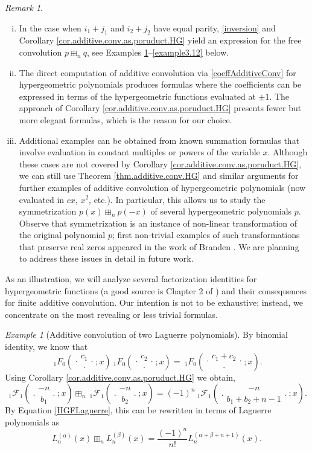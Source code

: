 \documentclass[reqno,11pt]{amsart}
\theoremstyle{remark}
\newtheorem{remark}[theorem]{Remark}
\newtheorem{example}[theorem]{Example}
\newcommand*\pFq[5]{%
 {\ }_{#1}{\mathcal F}_{#2}{\left(\genfrac..{0pt}{}{#3}{#4};#5\right)}%
}
\newcommand*\HGF[5]{%
 {\ }_{#1} F_{#2}{\left(\genfrac..{0pt}{}{#3}{#4};#5\right)}%
}
\begin{document}
\begin{remark} \label{remarkParity}
\begin{enumerate}[(i)]
    \item
    In the case when $i_1+j_1$ and $i_2+j_2$ have equal parity, \eqref{inversion} and Corollary \ref{cor.additive.conv.as.poruduct.HG} yield an expression for the free convolution $p \boxplus_n q$, see Examples \ref{example37}--\ref{example3.12} below. 

\item The direct computation of additive convolution via \eqref{coeffAdditiveConv} for hypergeometric polynomials produces formulas where the coefficients can be expressed in terms of the hypergeometric functions evaluated at $\pm 1$. The approach of Corollary \ref{cor.additive.conv.as.poruduct.HG} presents fewer but more elegant formulas, which is the reason for our choice.

\item  Additional examples can be obtained from known summation formulas that involve evaluation in constant multiples or powers of the variable $x$.
Although these cases are not covered by Corollary \ref{cor.additive.conv.as.poruduct.HG}, we can still use Theorem \ref{thm.additive.conv.HG} and similar arguments for further examples of additive convolution of hypergeometric polynomials (now evaluated in $cx$, $x^2$, etc.). In particular, this allows us to study the symmetrization $p(x)\boxplus_n p(-x)$ of several hypergeometric polynomials $p$. Observe that symmetrization is an instance of non-linear transformation of the original polynomial $p$; first non-trivial examples of such transformations that preserve real zeros appeared in the work of Branden \cite{MR2831515}. We are planning to address these issues in detail in future work. 
\end{enumerate}
\end{remark}

As an illustration, we will analyze several factorization identities for hypergeometric functions (a good source is Chapter 2 of \cite{grinshpan2013generalized}) and their consequences for finite additive convolution. Our intention is not to be exhaustive; instead, we concentrate on the most revealing or less trivial formulas.

\begin{example}[Additive convolution of two Laguerre polynomials] \label{example37}
By binomial identity, we know that 
$$
\HGF{1}{0}{c_1}{\cdot}{x}  \HGF{1}{0}{c_2}{\cdot}{ x}=\HGF{1}{0}{c_1+c_2}{\cdot}{x}.
$$
Using Corollary \ref{cor.additive.conv.as.poruduct.HG} we obtain,
$$
\pFq{1}{1}{-n}{b_1}{x} \boxplus_n \pFq{1}{1}{-n}{b_2}{x} =(-1)^n \pFq{1}{1}{-n}{b_1+b_2+n-1}{x}.
$$
By Equation \eqref{HGFLaguerre}, this can be rewritten in terms of Laguerre polynomials as
$$
L_n^{(\alpha)}(x) \boxplus_n L_n^{(\beta)}(x) =\frac{(-1)^n}{n!} L_n^{(\alpha+\beta+n+1)}(x).
$$
\end{example}
\end{document}

